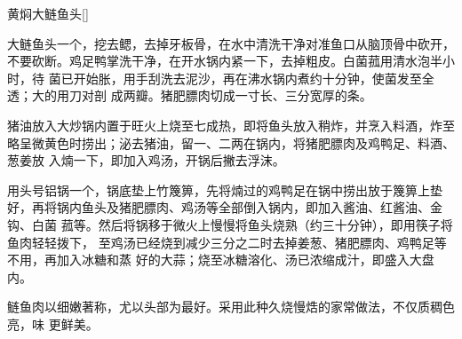 \begin{recipe}{黄焖大鲢鱼头}[\footnotemark]

\ingredients


\preparation

\step 大鲢鱼头一个，挖去鳃，去掉牙板骨，在水中清洗干净对准鱼口从脑顶骨中砍开，
不要砍断。鸡足鸭掌洗干净，在开水锅内紧一下，去掉粗皮。白菌菰用清水泡半小时，待
菌已开始胀，用手刮洗去泥沙，再在沸水锅内煮约十分钟，使菌发至全透；大的用刀对剖
成两瓣。猪肥膘肉切成一寸长、三分宽厚的条。

\step 猪油放入大炒锅内置于旺火上烧至七成热，即将鱼头放入稍炸，并烹入料酒，炸至
略呈微黄色时捞出；泌去猪油，留一、二两在锅内，将猪肥膘肉及鸡鸭足、料酒、葱姜放
入煵一下，即加入鸡汤，开锅后撇去浮沫。

\step 用头号铝锅一个，锅底垫上竹篾箅，先将煵过的鸡鸭足在锅中捞出放于篾箅上垫
好，再将锅内鱼头及猪肥膘肉、鸡汤等全部倒入锅内，即加入酱油、红酱油、金钩、白菌
菰等。然后将锅移于微火上慢慢将鱼头烧熟（约三十分钟），即用筷子将鱼肉轻轻拨下，
至鸡汤已经烧到减少三分之二时去掉姜葱、猪肥膘肉、鸡鸭足等不用，再加入冰糖和蒸
好的大蒜；烧至冰糖溶化、汤已浓缩成汁，即盛入大盘内。

\features

鲢鱼肉以细嫩著称，尤以头部为最好。采用此种久烧慢焅的家常做法，不仅质稠色亮，味
更鲜美。


\end{recipe}


